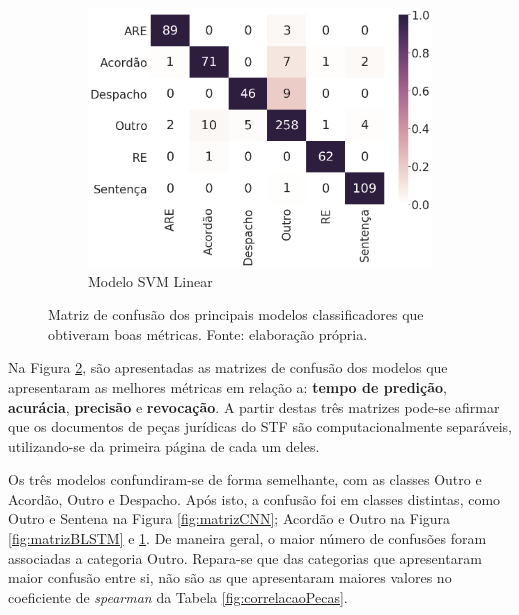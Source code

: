 \begin{figure}[ht]
\begin{subfigure}[b]{0.45\textwidth}
        \includegraphics[width=\textwidth]{figuras/matrizSVM}
        \caption{Modelo SVM Linear}
        \label{fig:matrizSVM}
    \end{subfigure}
    
    \caption[Matriz de confusão dos melhores classificadores]{Matriz de confusão dos principais modelos classificadores que obtiveram boas métricas. Fonte: elaboração própria.}
    \label{fig:matrizMelhoresModelos}
\end{figure}

Na Figura \ref{fig:matrizMelhoresModelos}, são apresentadas as matrizes de confusão dos modelos que apresentaram as melhores métricas em relação a: \textbf{tempo de predição}, \textbf{acurácia}, \textbf{precisão} e \textbf{revocação}. A partir destas três matrizes pode-se afirmar que os documentos de peças jurídicas do STF são computacionalmente separáveis, utilizando-se da primeira página de cada um deles. 

Os três modelos confundiram-se de forma semelhante, com as classes Outro e Acordão, Outro e Despacho. Após isto, a confusão foi em classes distintas, como Outro e Sentena na Figura \ref{fig:matrizCNN}; Acordão e Outro na Figura \ref{fig:matrizBLSTM} e \ref{fig:matrizSVM}. De maneira geral, o maior número de confusões foram associadas a categoria Outro. Repara-se que das categorias que apresentaram maior confusão entre si, não são as que apresentaram maiores valores no coeficiente de \textit{spearman} da Tabela \ref{fig:correlacaoPecas}.